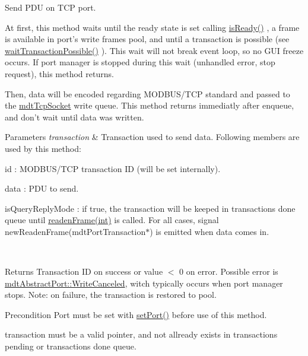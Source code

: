 Send P\-D\-U on T\-C\-P port. 

At first, this method waits until the ready state is set calling \hyperlink{classmdt_modbus_tcp_port_manager_a5477eb7e8d57c5a42004046b426e39b6}{is\-Ready()} , a frame is available in port's write frames pool, and until a transaction is possible (see \hyperlink{classmdt_port_manager_ac04a12f8aa20ba04695083afce45a6cc}{wait\-Transaction\-Possible()} ). This wait will not break event loop, so no G\-U\-I freeze occurs. If port manager is stopped during this wait (unhandled error, stop request), this method returns.

Then, data will be encoded regarding M\-O\-D\-B\-U\-S/\-T\-C\-P standard and passed to the \hyperlink{classmdt_tcp_socket}{mdt\-Tcp\-Socket} write queue. This method returns immediatly after enqueue, and don't wait until data was written.


\begin{DoxyParams}{Parameters}
{\em transaction} & Transaction used to send data. Following members are used by this method\-:
\begin{DoxyItemize}
\item id \-: M\-O\-D\-B\-U\-S/\-T\-C\-P transaction I\-D (will be set internally).
\item data \-: P\-D\-U to send.
\item is\-Query\-Reply\-Mode \-: if true, the transaction will be keeped in transactions done queue until \hyperlink{classmdt_port_manager_a830ae182d06dd6a52c43a7f45b9240ac}{readen\-Frame(int)} is called. For all cases, signal new\-Readen\-Frame(mdt\-Port\-Transaction$\ast$) is emitted when data comes in.
\end{DoxyItemize}\\
\hline
\end{DoxyParams}
\begin{DoxyReturn}{Returns}
Transaction I\-D on success or value $<$ 0 on error. Possible error is \hyperlink{classmdt_abstract_port_ad4121bb930c95887e77f8bafa065a85eae50ff4a9393507ad39005ddc7d5be42f}{mdt\-Abstract\-Port\-::\-Write\-Canceled}, witch typically occurs when port manager stops. Note\-: on failure, the transaction is restored to pool. 
\end{DoxyReturn}
\begin{DoxyPrecond}{Precondition}
Port must be set with \hyperlink{classmdt_port_manager_afcd156b2d0c9d340999935efb6cd8cb6}{set\-Port()} before use of this method. 

transaction must be a valid pointer, and not allready exists in transactions pending or transactions done queue. 
\end{DoxyPrecond}


